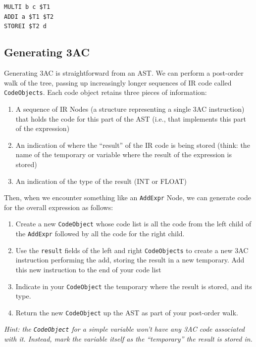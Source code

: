 \documentclass{article}
\begin{document}
\texttt{MULTI b c \$T1} \\
\texttt{ADDI a \$T1 \$T2}\\
\texttt{STOREI \$T2 d}\\

\subsection{Generating 3AC}
Generating 3AC is straightforward from an AST. We can perform a post-order walk of the tree, passing up increasingly longer sequences of IR code called \texttt{CodeObjects}. Each code object retains three pieces of information:
\begin{enumerate}
	\item A sequence of IR Nodes (a structure representing a single 3AC instruction) that holds the code for this part of the AST (i.e., that implements this part of the expression)
	\item An indication of where the ``result'' of the IR code is being stored (think: the name of the temporary or variable where the result of the expression is stored)
	\item An indication of the type of the result (INT or FLOAT)
\end{enumerate}

Then, when we encounter something like an \texttt{AddExpr} Node, we can generate code for the overall expression as follows:

\begin{enumerate}
	\item Create a new \texttt{CodeObject} whose code list is all the code from the left child of the \texttt{AddExpr} followed by all the code for the right child.
	\item Use the \texttt{result} fields of the left and right \texttt{CodeObjects} to create a new 3AC instruction performing the add, storing the result in a new temporary. Add this new instruction to the end of your code list
	\item Indicate in your \texttt{CodeObject} the temporary where the result is stored, and its type.
	\item Return the new \texttt{CodeObject} up the AST as part of your post-order walk.
\end{enumerate}

{\em Hint: the \texttt{CodeObject} for a simple variable won't have any 3AC code associated with it. Instead, mark the variable itself as the ``temporary'' the result is stored in.}
\end{document}
